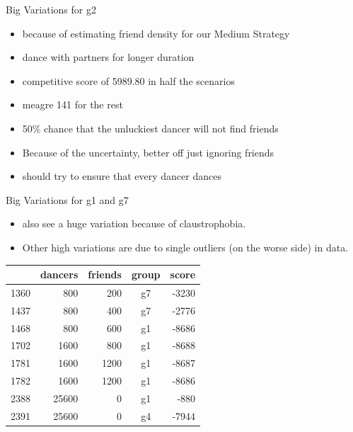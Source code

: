 \begin{frame}{Big Variations for g2}

\begin{itemize}
\tightlist
\item
  because of estimating friend density for our Medium Strategy
\item
  dance with partners for longer duration
\item
  competitive score of 5989.80 in half the scenarios
\item
  meagre 141 for the rest
\item
  50\% chance that the unluckiest dancer will not find friends
\item
  Because of the uncertainty, better off just ignoring friends
\item
  should try to ensure that every dancer dances
\end{itemize}

\end{frame}

\begin{frame}{Big Variations for g1 and g7}

\begin{itemize}
\tightlist
\item
  also see a huge variation because of claustrophobia.
\item
  Other high variations are due to single outliers (on the worse side)
  in data.
\end{itemize}

\begin{longtable}[c]{@{}lrrcr@{}}
\toprule
& dancers & friends & group & score\tabularnewline
\midrule
\endhead
1360 & 800 & 200 & g7 & -3230\tabularnewline
1437 & 800 & 400 & g7 & -2776\tabularnewline
1468 & 800 & 600 & g1 & -8686\tabularnewline
1702 & 1600 & 800 & g1 & -8688\tabularnewline
1781 & 1600 & 1200 & g1 & -8687\tabularnewline
1782 & 1600 & 1200 & g1 & -8686\tabularnewline
2388 & 25600 & 0 & g1 & -880\tabularnewline
2391 & 25600 & 0 & g4 & -7944\tabularnewline
\bottomrule
\end{longtable}

\end{frame}

